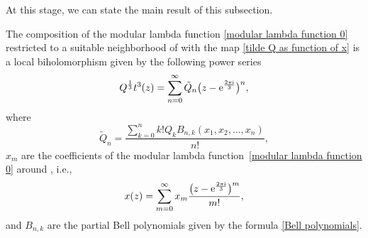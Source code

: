 At this stage, we can state the main result of this subsection.


\begin{Lemma}\label{t3 geometric interpretation}
 The composition of the modular lambda function \eqref{modular lambda function 0} restricted to a suitable neighborhood of  with the map \eqref{tilde Q as function of x} is a local biholomorphism given by the following power series
 \begin{gather}
 Q^{\frac{1}{3}}t^3(z) = \sum_{n=0}^{\infty}\tilde Q_n \bigl(z - {\rm e}^{\frac{2\pi {\rm i}}{3}} \bigr)^n,\label{local biholomorphism tildeQ to z}
 \end{gather}
 where
\[
 \tilde Q_n = \frac{ \sum_{k=0}^{n} k! Q_k B_{n,k} (x_1,x_2,\dots,x_n)}{n!},
 \]
 $x_m$ are the coefficients of the modular lambda function~\eqref{modular lambda function 0} around , i.e.,
 \begin{gather*}
 x(z) = \sum_{m=0}^{\infty} x_m \frac{\bigl( z - {\rm e}^{\frac{2\pi {\rm i}}{3}} \bigr)^m}{m!},
 \end{gather*}
 and $B_{n,k}$ are the partial Bell polynomials given by the formula \eqref{Bell polynomials}.
\end{Lemma}

